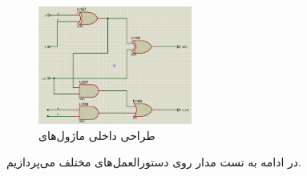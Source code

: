 \documentclass[12pt,onecolumn,a4paper,fleqn]{article}
\begin{document}
	\begin{figure}[H]
		\centering
		\includegraphics[width=0.45\textwidth]{source/full-adder.png}
		\caption{‌طراحی داخلی ماژول‌های }
		\label{fig:full-adder}
	\end{figure}
	\vspace*{7cm}
	\noindent
	در ادامه به تست مدار روی دستورالعمل‌های مختلف می‌پردازیم.
	\pagebreak
\end{document}
